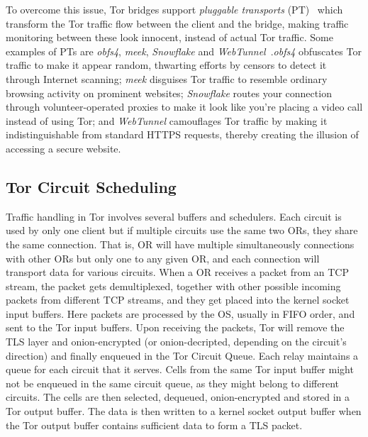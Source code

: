 To overcome this issue, Tor bridges support \textit{pluggable transports} (PT)~\cite{PlugTrans} which transform the Tor traffic flow between the client and the bridge, making traffic monitoring between these look innocent, instead of actual Tor traffic. Some examples of PTs are \textit{obfs4}, \textit{meek}, \textit{Snowflake} and \textit{WebTunnel}~\cite{Circumvention}.\@ \textit{obfs4} obfuscates Tor traffic to make it appear random, thwarting efforts by censors to detect it through Internet scanning; \textit{meek} disguises Tor traffic to resemble ordinary browsing activity on prominent websites; \textit{Snowflake} routes your connection through volunteer-operated proxies to make it look like you're placing a video call instead of using Tor; and \textit{WebTunnel} camouflages Tor traffic by making it indistinguishable from standard HTTPS requests, thereby creating the illusion of accessing a secure website.

\subsection{Tor Circuit Scheduling}\label{subsec:tor_scheduler}

Traffic handling in Tor involves several buffers and schedulers.
Each circuit is used by only one client but if multiple circuits use the same two ORs, they share the same connection. That is, OR will have multiple simultaneously connections with other ORs but only one to any given OR, and each connection will transport data for various circuits. 
When a OR receives a packet from an TCP stream, the packet gets demultiplexed, together with other possible incoming packets from different TCP streams, and they get placed into the kernel socket input buffers. Here packets are processed by the OS, usually in FIFO order, and sent to the Tor input buffers. Upon receiving the packets, Tor will remove the TLS layer and onion-encrypted (or onion-decripted, depending on the circuit's direction) and finally enqueued in the Tor Circuit Queue. Each relay maintains a queue for each circuit that it serves. Cells from the same Tor input buffer might not be enqueued in the same circuit queue, as they might belong to different circuits. The cells are then selected, dequeued, onion-encrypted and stored in a Tor output buffer. The data is then written to a kernel socket output buffer when the Tor output buffer contains sufficient data to form a TLS packet.

